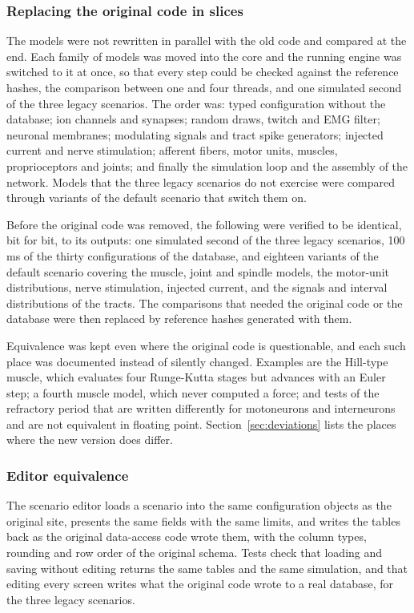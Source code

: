 \documentclass[pdflatex,sn-apa,iicol]{sn-jnl}
\begin{document}
\subsubsection{Replacing the original code in slices}\label{sec:slices}

The models were not rewritten in parallel with the old code and compared at the end. Each family of models was moved into the core and the running engine was switched to it at once, so that every step could be checked against the reference hashes, the comparison between one and four threads, and one simulated second of the three legacy scenarios. The order was: typed configuration without the database; ion channels and synapses; random draws, twitch and EMG filter; neuronal membranes; modulating signals and tract spike generators; injected current and nerve stimulation; afferent fibers, motor units, muscles, proprioceptors and joints; and finally the simulation loop and the assembly of the network. Models that the three legacy scenarios do not exercise were compared through variants of the default scenario that switch them on.

Before the original code was removed, the following were verified to be identical, bit for bit, to its outputs: one simulated second of the three legacy scenarios, 100\,ms of the thirty configurations of the database, and eighteen variants of the default scenario covering the muscle, joint and spindle models, the motor-unit distributions, nerve stimulation, injected current, and the signals and interval distributions of the tracts. The comparisons that needed the original code or the database were then replaced by reference hashes generated with them.

Equivalence was kept even where the original code is questionable, and each such place was documented instead of silently changed. Examples are the Hill-type muscle, which evaluates four Runge-Kutta stages but advances with an Euler step; a fourth muscle model, which never computed a force; and tests of the refractory period that are written differently for motoneurons and interneurons and are not equivalent in floating point. Section~\ref{sec:deviations} lists the places where the new version does differ.

\subsubsection{Editor equivalence}\label{sec:editor}

The scenario editor loads a scenario into the same configuration objects as the original site, presents the same fields with the same limits, and writes the tables back as the original data-access code wrote them, with the column types, rounding and row order of the original schema. Tests check that loading and saving without editing returns the same tables and the same simulation, and that editing every screen writes what the original code wrote to a real database, for the three legacy scenarios.
\end{document}
